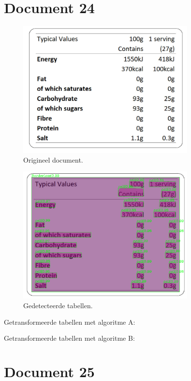 \section{Document 24}

\begin{figure}[H]
    \centering
    \includegraphics[width=0.8\textwidth]{test-resultaten/24/original.jpg}
    \caption{Origineel document.}
\end{figure}

\begin{figure}[H]
    \centering
    \includegraphics[width=0.8\textwidth]{test-resultaten/24/detected_tables.png}
    \caption{Gedetecteerde tabellen.}
\end{figure}

Getransformeerde tabellen met algoritme A:

Getransformeerde tabellen met algoritme B:
\section{Document 25}

